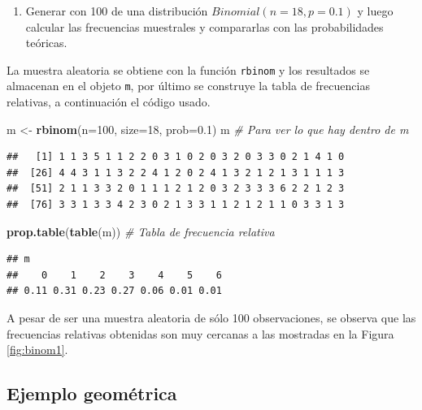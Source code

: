 \documentclass[10pt,]{krantz}
\makeatletter
\newenvironment{Shaded}{\begin{snugshade}}{\end{snugshade}}
\newcommand{\KeywordTok}[1]{\textcolor[rgb]{0.13,0.29,0.53}{\textbf{{#1}}}}
\newcommand{\DataTypeTok}[1]{\textcolor[rgb]{0.13,0.29,0.53}{{#1}}}
\newcommand{\DecValTok}[1]{\textcolor[rgb]{0.00,0.00,0.81}{{#1}}}
\newcommand{\FloatTok}[1]{\textcolor[rgb]{0.00,0.00,0.81}{{#1}}}
\newcommand{\StringTok}[1]{\textcolor[rgb]{0.31,0.60,0.02}{{#1}}}
\newcommand{\CommentTok}[1]{\textcolor[rgb]{0.56,0.35,0.01}{\textit{{#1}}}}
\newcommand{\NormalTok}[1]{{#1}}
\providecommand{\tightlist}{%
  \setlength{\itemsep}{0pt}\setlength{\parskip}{0pt}}
\newenvironment{kframe}{%
\medskip{}
\setlength{\fboxsep}{.8em}
 \def\at@end@of@kframe{}%
 \ifinner\ifhmode%
  \def\at@end@of@kframe{\end{minipage}}%
  \begin{minipage}{\columnwidth}%
 \fi\fi%
 \def\FrameCommand##1{\hskip\@totalleftmargin \hskip-\fboxsep
 \colorbox{shadecolor}{##1}\hskip-\fboxsep
     \hskip-\linewidth \hskip-\@totalleftmargin \hskip\columnwidth}%
 \MakeFramed {\advance\hsize-\width
   \@totalleftmargin\z@ \linewidth\hsize
   \@setminipage}}%
 {\par\unskip\endMakeFramed%
 \at@end@of@kframe}
\renewenvironment{Shaded}{\begin{kframe}}{\end{kframe}}
\makeatother
\begin{document}
\begin{enumerate}
\def\labelenumi{\arabic{enumi})}
\setcounter{enumi}{4}
\tightlist
\item
  Generar con 100 de una distribución \(Binomial(n=18, p=0.1)\) y luego
  calcular las frecuencias muestrales y compararlas con las
  probabilidades teóricas.
\end{enumerate}

La muestra aleatoria se obtiene con la función \texttt{rbinom} y los
resultados se almacenan en el objeto \texttt{m}, por último se construye
la tabla de frecuencias relativas, a continuación el código usado.

\begin{Shaded}
\begin{Highlighting}[]
\NormalTok{m <-}\StringTok{ }\KeywordTok{rbinom}\NormalTok{(}\DataTypeTok{n=}\DecValTok{100}\NormalTok{, }\DataTypeTok{size=}\DecValTok{18}\NormalTok{, }\DataTypeTok{prob=}\FloatTok{0.1}\NormalTok{)}
\NormalTok{m  }\CommentTok{# Para ver lo que hay dentro de m}
\end{Highlighting}
\end{Shaded}

\begin{verbatim}
##   [1] 1 1 3 5 1 1 2 2 0 3 1 0 2 0 3 2 0 3 3 0 2 1 4 1 0
##  [26] 4 4 3 1 1 3 2 2 4 1 2 0 2 4 1 3 2 1 2 1 3 1 1 1 3
##  [51] 2 1 1 3 3 2 0 1 1 1 2 1 2 0 3 2 3 3 3 6 2 2 1 2 3
##  [76] 3 3 1 3 3 4 2 3 0 2 1 3 3 1 1 2 1 2 1 1 0 3 3 1 3
\end{verbatim}

\begin{Shaded}
\begin{Highlighting}[]
\KeywordTok{prop.table}\NormalTok{(}\KeywordTok{table}\NormalTok{(m))  }\CommentTok{# Tabla de frecuencia relativa}
\end{Highlighting}
\end{Shaded}

\begin{verbatim}
## m
##    0    1    2    3    4    5    6 
## 0.11 0.31 0.23 0.27 0.06 0.01 0.01
\end{verbatim}

A pesar de ser una muestra aleatoria de sólo 100 observaciones, se
observa que las frecuencias relativas obtenidas son muy cercanas a las
mostradas en la Figura \ref{fig:binom1}.

\subsection*{Ejemplo geométrica}\label{ejemplo-geometrica}
\end{document}
